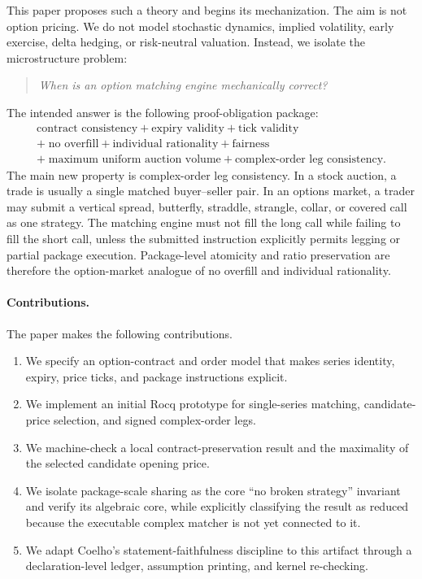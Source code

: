 \documentclass[11pt]{article}
\begin{document}
This paper proposes such a theory and begins its mechanization. The aim is not option pricing. We do not model stochastic dynamics, implied volatility, early exercise, delta hedging, or risk-neutral valuation. Instead, we isolate the microstructure problem:
\begin{quote}
\emph{When is an option matching engine mechanically correct?}
\end{quote}
The intended answer is the following proof-obligation package:
\[
\boxed{
\begin{gathered}
\text{contract consistency} + \text{expiry validity} + \text{tick validity} \\
+\; \text{no overfill} + \text{individual rationality} + \text{fairness} \\
+\; \text{maximum uniform auction volume} + \text{complex-order leg consistency}.
\end{gathered}}
\]
The main new property is complex-order leg consistency. In a stock auction, a trade is usually a single matched buyer--seller pair. In an options market, a trader may submit a vertical spread, butterfly, straddle, strangle, collar, or covered call as one strategy. The matching engine must not fill the long call while failing to fill the short call, unless the submitted instruction explicitly permits legging or partial package execution. Package-level atomicity and ratio preservation are therefore the option-market analogue of no overfill and individual rationality.

\paragraph{Contributions.}
The paper makes the following contributions.
\begin{enumerate}[label=(C\arabic*)]
  \item We specify an option-contract and order model that makes series identity, expiry, price ticks, and package instructions explicit.
  \item We implement an initial Rocq prototype for single-series matching, candidate-price selection, and signed complex-order legs.
  \item We machine-check a local contract-preservation result and the maximality of the selected candidate opening price.
  \item We isolate package-scale sharing as the core ``no broken strategy'' invariant and verify its algebraic core, while explicitly classifying the result as reduced because the executable complex matcher is not yet connected to it.
  \item We adapt Coelho's statement-faithfulness discipline to this artifact through a declaration-level ledger, assumption printing, and kernel re-checking.
\end{enumerate}
\end{document}
